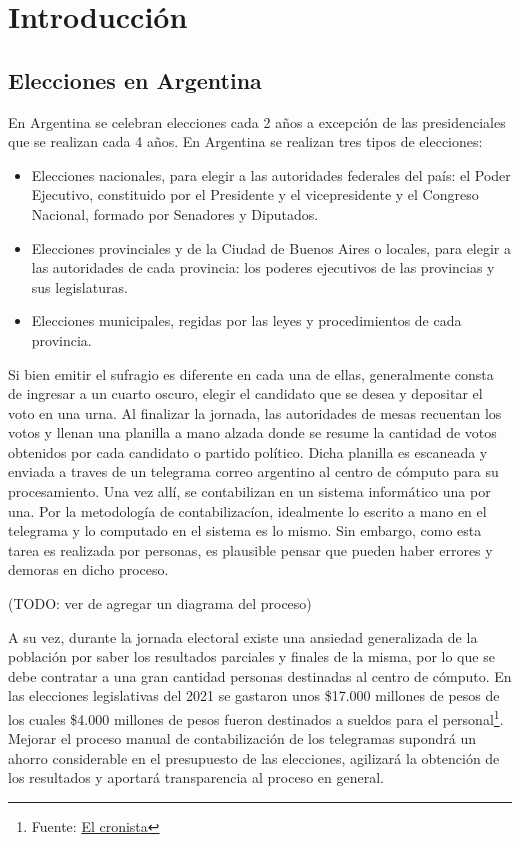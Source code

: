 \chapter{Introducci\'on}

\label{Chapter1}

\section{Elecciones en Argentina}

En Argentina se celebran elecciones cada 2 a\~{n}os a excepci\'on de las presidenciales que se realizan cada 4
a\~{n}os. En Argentina se realizan tres tipos de elecciones:

\begin{itemize}
    \item Elecciones nacionales, para elegir a las autoridades federales del país: el Poder Ejecutivo, constituido por el
          Presidente y el vicepresidente y el Congreso Nacional, formado por Senadores y Diputados.
    \item Elecciones provinciales y de la Ciudad de Buenos Aires o locales, para elegir a las autoridades de cada provincia: los
          poderes ejecutivos de las provincias y sus legislaturas.
    \item Elecciones municipales, regidas por las leyes y procedimientos de cada provincia.
\end{itemize}

Si bien emitir el sufragio es diferente en cada una de ellas, generalmente consta de ingresar a un cuarto oscuro,
elegir el candidato que se desea y depositar el voto en una urna. Al finalizar la jornada, las autoridades de mesas
recuentan los votos y llenan una planilla a mano alzada donde se resume la cantidad de votos obtenidos por cada
candidato o partido pol\'itico. Dicha planilla es escaneada y enviada a traves de un telegrama correo argentino al
centro de c\'omputo para su procesamiento. Una vez all\'i, se contabilizan en un sistema inform\'atico una por una. Por
la metodolog\'ia de contabilizac\'ion, idealmente lo escrito a mano en el telegrama y lo computado en el sistema es lo
mismo. Sin embargo, como esta tarea es realizada por personas, es plausible pensar que pueden haber errores y demoras
en dicho proceso.

(TODO: ver de agregar un diagrama del proceso)

A su vez, durante la jornada electoral existe una ansiedad generalizada de la poblaci\'on por saber los resultados
parciales y finales de la misma, por lo que se debe contratar a una gran cantidad personas destinadas al centro de
c\'omputo. En las elecciones legislativas del 2021 se gastaron unos \$17.000 millones de pesos de los cuales \$4.000
millones de pesos fueron destinados a sueldos para el personal\footnote{Fuente:
    \href{https://www.cronista.com/economia-politica/Elecciones-legislativas-2021-cuanto-mas-se-gastara-por-el-coronavirus-segun-el-Presupuesto-20201004-0006.html}{El
        cronista}}. Mejorar el proceso manual de contabilizaci\'on de los telegramas supondr\'a un ahorro considerable en el
presupuesto de las elecciones, agilizar\'a la obtenci\'on de los resultados y aportar\'a transparencia al proceso en
general.

